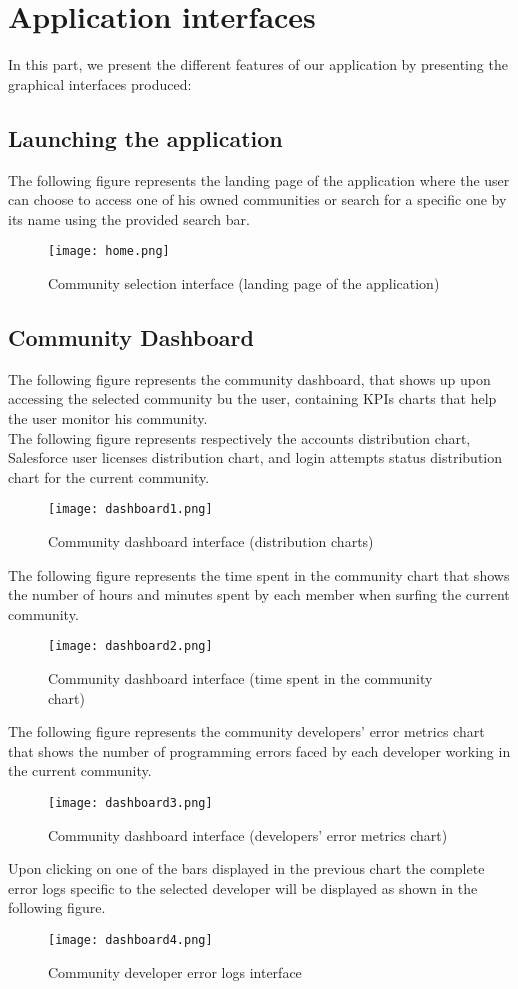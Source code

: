 \section{Application interfaces}
In this part, we present the different features of our
application by presenting the graphical interfaces produced:
\subsection{Launching the application}
The following figure represents the landing page of the application where the user can choose to access one of his owned communities or search for a specific one by its name using the provided search bar.
\begin{figure}[H]%
    \center   
    \texttt{[image: home.png]}
    \caption{Community selection interface (landing page of the application)}
\end{figure}
\subsection{Community Dashboard}
The following figure represents the community dashboard, that shows up upon accessing the selected community bu the user, containing KPIs charts that help the user monitor his community.\\
The following figure represents respectively the accounts distribution chart, Salesforce user licenses distribution chart, and login attempts status distribution chart for the current community.
\begin{figure}[H]%
    \center   
    \texttt{[image: dashboard1.png]}
    \caption{Community dashboard interface (distribution charts)}
\end{figure}
The following figure represents the time spent in the community chart that shows the number of hours and minutes spent by each member when surfing the current community.
\begin{figure}[H]%
    \center   
    \texttt{[image: dashboard2.png]}
    \caption{Community dashboard interface (time spent in the community chart)}
\end{figure}
The following figure represents the community developers' error metrics chart that shows the number of programming errors faced by each developer working in the current community.
\begin{figure}[H]%
    \center   
    \texttt{[image: dashboard3.png]}
    \caption{Community dashboard interface (developers' error metrics chart)}
\end{figure}
Upon clicking on one of the bars displayed in the previous chart the complete error logs specific to the selected developer will be displayed as shown in the following figure.
\begin{figure}[H]%
    \center   
    \texttt{[image: dashboard4.png]}
    \caption{Community developer error logs interface}
\end{figure}
